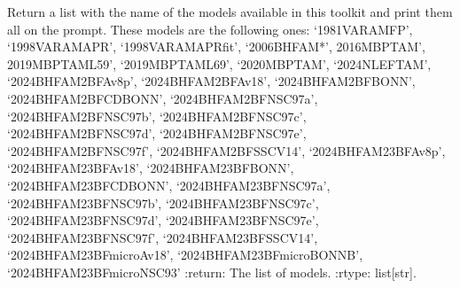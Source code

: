 \documentclass[letterpaper,10pt,english]{sphinxmanual}
\begin{document}
\begin{fulllineitems}
\label{\detokenize{source/api/setup_eos_micro_esym:nucleardatapy.eos.setup_micro_esym.micro_esym_models}}
\pysigstartsignatures
{}
\pysigstopsignatures
\sphinxAtStartPar
Return a list with the name of the models available in this toolkit and     print them all on the prompt. These models are the following ones:     ‘1981\sphinxhyphen{}VAR\sphinxhyphen{}AM\sphinxhyphen{}FP’, ‘1998\sphinxhyphen{}VAR\sphinxhyphen{}AM\sphinxhyphen{}APR’, ‘1998\sphinxhyphen{}VAR\sphinxhyphen{}AM\sphinxhyphen{}APRfit’, ‘2006\sphinxhyphen{}BHF\sphinxhyphen{}AM*’,     2016\sphinxhyphen{}MBPT\sphinxhyphen{}AM’, 2019\sphinxhyphen{}MBPT\sphinxhyphen{}AM\sphinxhyphen{}L59’, ‘2019\sphinxhyphen{}MBPT\sphinxhyphen{}AM\sphinxhyphen{}L69’,     ‘2020\sphinxhyphen{}MBPT\sphinxhyphen{}AM’, ‘2024\sphinxhyphen{}NLEFT\sphinxhyphen{}AM’,     ‘2024\sphinxhyphen{}BHF\sphinxhyphen{}AM\sphinxhyphen{}2BF\sphinxhyphen{}Av8p’, ‘2024\sphinxhyphen{}BHF\sphinxhyphen{}AM\sphinxhyphen{}2BF\sphinxhyphen{}Av18’, ‘2024\sphinxhyphen{}BHF\sphinxhyphen{}AM\sphinxhyphen{}2BF\sphinxhyphen{}BONN’, ‘2024\sphinxhyphen{}BHF\sphinxhyphen{}AM\sphinxhyphen{}2BF\sphinxhyphen{}CDBONN’,     ‘2024\sphinxhyphen{}BHF\sphinxhyphen{}AM\sphinxhyphen{}2BF\sphinxhyphen{}NSC97a’, ‘2024\sphinxhyphen{}BHF\sphinxhyphen{}AM\sphinxhyphen{}2BF\sphinxhyphen{}NSC97b’, ‘2024\sphinxhyphen{}BHF\sphinxhyphen{}AM\sphinxhyphen{}2BF\sphinxhyphen{}NSC97c’, ‘2024\sphinxhyphen{}BHF\sphinxhyphen{}AM\sphinxhyphen{}2BF\sphinxhyphen{}NSC97d’,     ‘2024\sphinxhyphen{}BHF\sphinxhyphen{}AM\sphinxhyphen{}2BF\sphinxhyphen{}NSC97e’, ‘2024\sphinxhyphen{}BHF\sphinxhyphen{}AM\sphinxhyphen{}2BF\sphinxhyphen{}NSC97f’, ‘2024\sphinxhyphen{}BHF\sphinxhyphen{}AM\sphinxhyphen{}2BF\sphinxhyphen{}SSCV14’,    ‘2024\sphinxhyphen{}BHF\sphinxhyphen{}AM\sphinxhyphen{}23BF\sphinxhyphen{}Av8p’, ‘2024\sphinxhyphen{}BHF\sphinxhyphen{}AM\sphinxhyphen{}23BF\sphinxhyphen{}Av18’, ‘2024\sphinxhyphen{}BHF\sphinxhyphen{}AM\sphinxhyphen{}23BF\sphinxhyphen{}BONN’, ‘2024\sphinxhyphen{}BHF\sphinxhyphen{}AM\sphinxhyphen{}23BF\sphinxhyphen{}CDBONN’,     ‘2024\sphinxhyphen{}BHF\sphinxhyphen{}AM\sphinxhyphen{}23BF\sphinxhyphen{}NSC97a’, ‘2024\sphinxhyphen{}BHF\sphinxhyphen{}AM\sphinxhyphen{}23BF\sphinxhyphen{}NSC97b’, ‘2024\sphinxhyphen{}BHF\sphinxhyphen{}AM\sphinxhyphen{}23BF\sphinxhyphen{}NSC97c’, ‘2024\sphinxhyphen{}BHF\sphinxhyphen{}AM\sphinxhyphen{}23BF\sphinxhyphen{}NSC97d’,     ‘2024\sphinxhyphen{}BHF\sphinxhyphen{}AM\sphinxhyphen{}23BF\sphinxhyphen{}NSC97e’, ‘2024\sphinxhyphen{}BHF\sphinxhyphen{}AM\sphinxhyphen{}23BF\sphinxhyphen{}NSC97f’, ‘2024\sphinxhyphen{}BHF\sphinxhyphen{}AM\sphinxhyphen{}23BF\sphinxhyphen{}SSCV14’,    ‘2024\sphinxhyphen{}BHF\sphinxhyphen{}AM\sphinxhyphen{}23BFmicro\sphinxhyphen{}Av18’, ‘2024\sphinxhyphen{}BHF\sphinxhyphen{}AM\sphinxhyphen{}23BFmicro\sphinxhyphen{}BONNB’, ‘2024\sphinxhyphen{}BHF\sphinxhyphen{}AM\sphinxhyphen{}23BFmicro\sphinxhyphen{}NSC93’
:return: The list of models.
:rtype: list{[}str{]}.

\end{fulllineitems}
\end{document}
